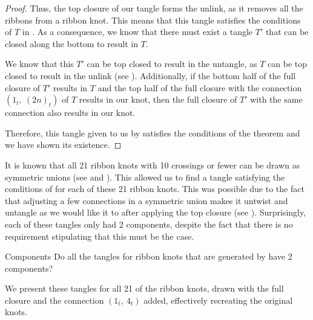 \begin{paper}
\begin{proof}
Thus, the top closure of our tangle forms the unlink, as it removes all the
ribbons from a ribbon knot.
This means that this tangle satisfies the conditions of $T$ in \lemTangles.
As a consequence, we know that there must exist a tangle $T'$ that can be closed
along the bottom to result in $T$.

We know that this $T'$ can be top closed to result in the untangle, as $T$ can
be top closed to result in the unlink (see \figLemma).
Additionally, if the bottom half of the full closure of $T'$ results in $T$ and
the top half of the full closure with the connection $(1_t,~(2n)_t)$ of $T$
results in our knot, then the full closure of $T'$ with the same connection also
results in our knot.

Therefore, this tangle given to us by \lemTangles satisfies the conditions of
the theorem and we have shown its existence.
\end{proof}


It is known that all 21 ribbon knots with 10 crossings or fewer can be drawn as
symmetric unions (see \cite{many} and \cite{one}).
This allowed us to find a tangle satisfying the conditions of \thmRibbon for
each of these 21 ribbon knots.
This was possible due to the fact that adjusting a few connections in a
symmetric union makes it untwist and untangle as we would like it to after
applying the top closure (see \figTop).
Surprisingly, each of these tangles only had 2 components, despite the fact that
there is no requirement stipulating that this must be the case.

\begin{paperqtn}{Components}
Do all the tangles for ribbon knots that are generated by \thmRibbon have 2
components?
\end{paperqtn}

We present these tangles for all 21 of the ribbon knots, drawn with the full
closure and the connection $(1_t,~4_t)$ added, effectively recreating the
original knots.
\end{paper}

